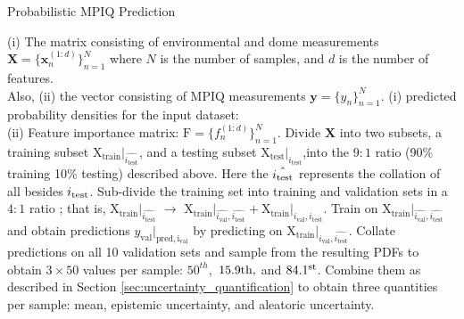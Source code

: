 \iffalse
\begin{algorithm}
\caption{Probabilistic MPIQ Prediction}
\label{algo:putting_it_all_together}
\begin{algorithmic}[1]
\renewcommand{\algorithmicrequire}{\textbf{Input:}}
\renewcommand{\algorithmicensure}{\textbf{Output:}}
\REQUIRE (i) The matrix consisting of environmental and dome measurements $\mathbf{X} = \{\mathbf{x}_{n}^{(1:d)}\}^{N}_{n=1}$ where $N$ is the number of samples, and $d$ is the number of features.\\ Also, (ii) the vector consisting of MPIQ measurements $\mathbf{y} = \{y_{n}\}^{N}_{n=1}$.
\ENSURE (i) predicted probability densities for the input dataset:   \\
(ii) Feature importance matrix: $\boldsymbol{\mathrm{F}} = \{f_{n}^{(1:d)}\}^{N}_{n=1}$.
\STATE Divide $\mathbf{X}$ into two subsets, a training subset $\boldsymbol{\mathrm{X_{train}}}\vert_{\hat{i_\mathrm{test}}}$, and a testing subset $\boldsymbol{\mathrm{X_{test}}}\vert_{i_\mathrm{test}}$,into the $9:1$ ratio (90\% training 10\% testing) described above. Here the $\hat{i_{\rm{test}}}$ represents the collation of all   besides $i_{\rm{test}}$. 
\STATE Sub-divide the training set into training and validation sets in a $4:1$ ratio ; that is, $\boldsymbol{\mathrm{X_{train}}}\vert_{\hat{i_\mathrm{test}}}$ $\rightarrow$ $\boldsymbol{\mathrm{X_{train}}}\vert_{\hat{i_\mathrm{val}},\hat{i_\mathrm{test}}} + \boldsymbol{\mathrm{X_{train}}}\vert_{i_\mathrm{val},\hat{i_\mathrm{test}}}$.
\STATE Train on $\boldsymbol{\mathrm{X_{train}}}\vert_{\hat{i_\mathrm{val}},\hat{i_\mathrm{test}}}$ and obtain predictions $y_{\mathrm{val}}\vert_\mathrm{pred, i_\mathrm{val}}$ by predicting on $\boldsymbol{\mathrm{X_{train}}}\vert_{i_\mathrm{val},\hat{i_\mathrm{test}}}$.
\ENDFOR
\STATE Collate predictions on all 10 validation sets and sample from the resulting PDFs to obtain $3\times50$ values per sample: $50^{th},$ $15.9{\rm th},$ and $84.1^{\rm st}$.  Combine them as described in Section \ref{sec:uncertainty_quantification} to obtain three quantities per sample: mean, epistemic uncertainty, and aleatoric uncertainty.%

\end{algorithmic}
\end{algorithm}
